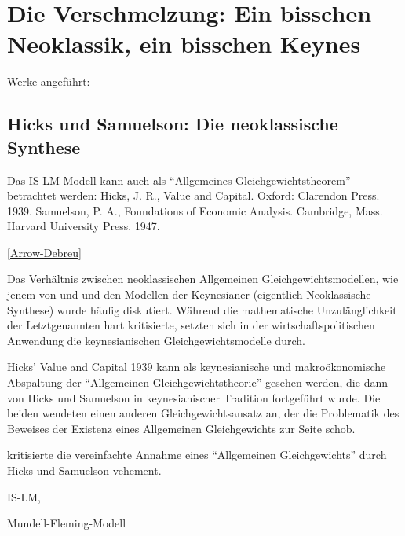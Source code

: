 %
%
%

\chapter{Die Verschmelzung: Ein bisschen Neoklassik, ein bisschen Keynes}
\label{Synthese}

Werke angeführt: \parencite[S. 57]{Snowdon2005}

\section{Hicks und Samuelson: Die neoklassische Synthese}



Das IS-LM-Modell kann auch als "`Allgemeines Gleichgewichtstheorem"' betrachtet werden:
Hicks, J. R., Value and Capital. Oxford: Clarendon Press. 1939.
Samuelson, P. A., Foundations of Economic Analysis. Cambridge, Mass. Harvard University Press. 1947.

\ref{Arrow-Debreu}

Das Verhältnis zwischen neoklassischen Allgemeinen Gleichgewichtsmodellen, wie jenem von \textcite{Arrow1954} und \textcite{McKenzie1954} und den Modellen der Keynesianer (eigentlich Neoklassische Synthese) \textcite{Hicks1939} wurde häufig diskutiert. Während \textcite{Morgenstern1941} die mathematische Unzulänglichkeit der Letztgenannten hart kritisierte, setzten sich in der wirtschaftspolitischen Anwendung die keynesianischen Gleichgewichtsmodelle durch.



Hicks' Value and Capital 1939 \parencite[S. 20]{Weintraub1983} kann als keynesianische und makroökonomische Abspaltung der "`Allgemeinen Gleichgewichtstheorie"' gesehen werden, die dann von Hicks und Samuelson in keynesianischer Tradition fortgeführt wurde. 
Die beiden wendeten einen anderen Gleichgewichtsansatz an, der die Problematik des Beweises der Existenz eines Allgemeinen Gleichgewichts zur Seite schob.\parencite[S. 21]{Weintraub1983}

\textcite{Morgenstern1941} kritisierte die vereinfachte Annahme eines "`Allgemeinen Gleichgewichts"' durch Hicks und Samuelson vehement. 

IS-LM, 


Mundell-Fleming-Modell


